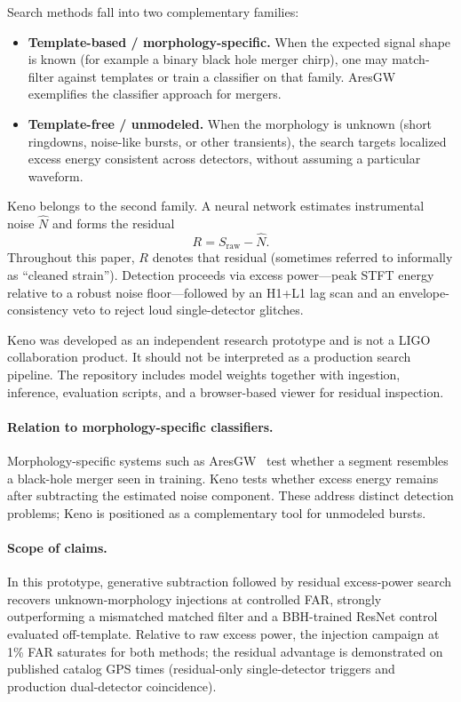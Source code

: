 \documentclass[11pt,a4paper]{article}
\begin{document}
Search methods fall into two complementary families:
\begin{itemize}
  \item \textbf{Template-based / morphology-specific.} When the expected signal
        shape is known (for example a binary black hole merger chirp), one may
        match-filter against templates or train a classifier on that family.
        AresGW~\citep{nousi2023,koloniari2025} exemplifies the classifier
        approach for mergers.
  \item \textbf{Template-free / unmodeled.} When the morphology is unknown
        (short ringdowns, noise-like bursts, or other transients), the search
        targets localized excess energy consistent across detectors, without
        assuming a particular waveform.
\end{itemize}

Keno belongs to the second family. A neural network estimates instrumental
noise $\hat{N}$ and forms the residual
\begin{equation}
R = S_{\mathrm{raw}} - \hat{N}.
\end{equation}
Throughout this paper, $R$ denotes that residual (sometimes referred to
informally as ``cleaned strain''). Detection proceeds via excess power---peak
STFT energy relative to a robust noise floor---followed by an H1+L1 lag scan
and an envelope-consistency veto to reject loud single-detector glitches.

Keno was developed as an independent research prototype and is not a LIGO
collaboration product. It should not be interpreted as a production search
pipeline. The repository includes model weights together with ingestion,
inference, evaluation scripts, and a browser-based viewer for residual
inspection.

\paragraph{Relation to morphology-specific classifiers.}
Morphology-specific systems such as AresGW~\citep{nousi2023} test whether a
segment resembles a black-hole merger seen in training. Keno tests whether
excess energy remains after subtracting the estimated noise component. These
address distinct detection problems; Keno is positioned as a complementary tool
for unmodeled bursts.

\paragraph{Scope of claims.}
In this prototype, generative subtraction followed by residual excess-power
search recovers unknown-morphology injections at controlled FAR, strongly
outperforming a mismatched matched filter and a BBH-trained ResNet control
evaluated off-template. Relative to raw excess power, the injection campaign
at 1\% FAR saturates for both methods; the residual advantage is demonstrated
on published catalog GPS times (residual-only single-detector triggers and
production dual-detector coincidence).
\end{document}
